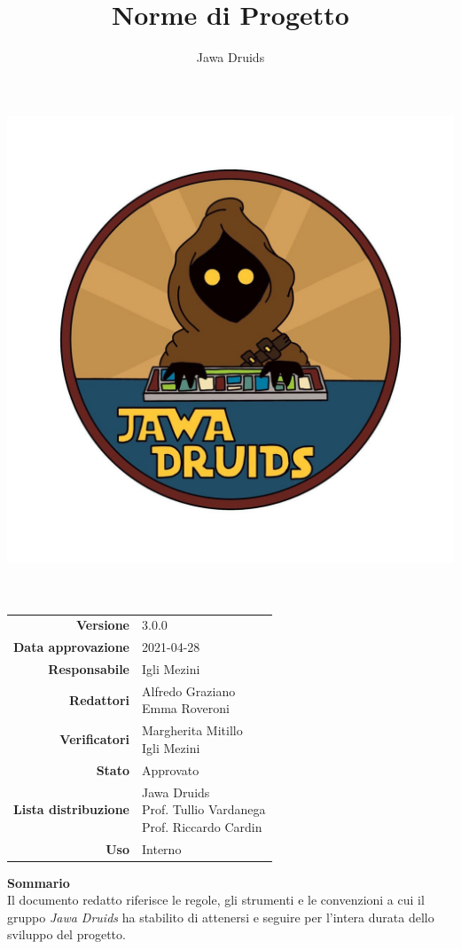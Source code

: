 



\makeatletter
\begin{titlepage}
	\begin{center}
		\vspace*{-4cm}
		\author{Jawa Druids} 
		\title{Norme di Progetto}
		\date{} %
		\includegraphics[width=0.5\linewidth]{../immagini/DRUIDSLOGO.jpg}\\[4ex]
		{\huge \bfseries  \@title }\\[2ex] 
		{\LARGE  \@author}\\[50ex]
		\vspace*{-9cm}
		\begin{table}[H]
			\renewcommand{\arraystretch}{1.4}
			\centering
			\begin{tabular}{r | l}
				\textbf{Versione} & 3.0.0 \\%
				\textbf{Data approvazione} & 2021-04-28\\
				\textbf{Responsabile} & Igli Mezini \\
				\textbf{Redattori} & \makecell[tl]{Alfredo Graziano \\ Emma Roveroni} \\		
				\textbf{Verificatori} & \makecell[tl]{Margherita Mitillo \\ Igli Mezini} \\
				\textbf{Stato} & Approvato\\
				\textbf{Lista distribuzione} & \makecell[tl]{Jawa Druids \\ Prof. Tullio Vardanega \\ Prof. Riccardo Cardin}\\
				\textbf{Uso} & Interno     
			\end{tabular}
		\end{table}
		\vspace{0.1cm}
		\hfill \break
		\fontsize{17}{10}\textbf{Sommario} \\
		\vspace{0.1cm}
		Il documento redatto riferisce le regole, gli strumenti e le convenzioni a cui il gruppo \emph{\normalsize{\textit{Jawa Druids}}} ha stabilito di attenersi e seguire per l'intera durata dello sviluppo del progetto.
	\end{center}
\end{titlepage}
\makeatother
	

